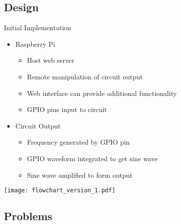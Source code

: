 \subsection{Design}

\begin{frame}{Initial Implementation}
  \begin{block}{}
  \begin{itemize}
    \item Raspberry Pi 
      \begin{itemize}
        \item Host web server
        \item Remote manipulation of circuit output
        \item Web interface can provide additional functionality
        \item GPIO pins input to circuit
      \end{itemize}
    \item Circuit Output
      \begin{itemize}
        \item Frequency generated by GPIO pin 
        \item GPIO waveform integrated to get sine wave
        \item Sine wave amplified to form output
      \end{itemize}
    \end{itemize}
  \end{block}

  \begin{center}
  \texttt{[image: flowchart\_version\_1.pdf]}
  \end{center}
\end{frame}

\subsection{Problems}

